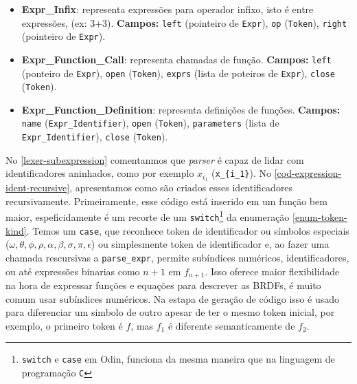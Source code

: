 \begin{itemize}
  \item \textbf{Expr\_Infix}: representa expressões para operador infixo, isto é entre expressões, (ex: 3+3).
      \textbf{Campos:}
        \texttt{left} (pointeiro de \texttt{Expr}), \texttt{op} (\texttt{Token}), \texttt{right} (pointeiro de \texttt{Expr}).

\item \textbf{Expr\_Function\_Call}: representa chamadas de função.
      \textbf{Campos:}
      \texttt{left} (ponteiro de \texttt{Expr}), \texttt{open} (\texttt{Token}),
      \texttt{exprs} (lista de poteiros de \texttt{Expr}), \texttt{close} (\texttt{Token}).

\item \textbf{Expr\_Function\_Definition}: representa definições de funções.
      \textbf{Campos:}
      \texttt{name} (\texttt{Expr\_Identifier}), \texttt{open} (\texttt{Token}),
      \texttt{parameters} (lista de \texttt{Expr\_Identifier}), \texttt{close} (\texttt{Token}).
\end{itemize}





No \autoref{lexer-subexpression} comentanmos que \textit{parser} é capaz de lidar com identificadores aninhados, como por exemplo $x_{i_1}$ (\verb"x_{i_1}"). No \autoref{cod-expression-ident-recursive}, apresentamos como são criados esses identificadores recursivamente. Primeiramente, esse código está inserido em um função bem maior, espeficidamente é um recorte de um \texttt{switch}\footnote{\texttt{switch} e \texttt{case} em Odin, funciona da mesma maneira que na linguagem de programação \texttt{C}} da enumeração \autoref{enum-token-kind}. Temos um \texttt{case}, que reconhece token de identificador ou símbolos especiais ($ \omega, \theta, \phi, \rho, \alpha, \beta, \sigma, \pi, \epsilon$) ou simplesmente token de identificador e, ao fazer uma chamada rescursivas a \texttt{parse\_expr}, permite subíndices numéricos, identificadores, ou até expressões binarias como $n+1$ em $f_{n+1}$. Isso oferece maior flexibilidade na hora de expressar funções e equações para descrever as BRDFs, é muito comum usar subíndices numéricos. Na estapa de geração de código isso é usado para diferenciar um simbolo de outro apesar de ter o mesmo token inicial, por exemplo, o primeiro token é $f$, mas $f_1$ é diferente semanticamente de $f_2$.



